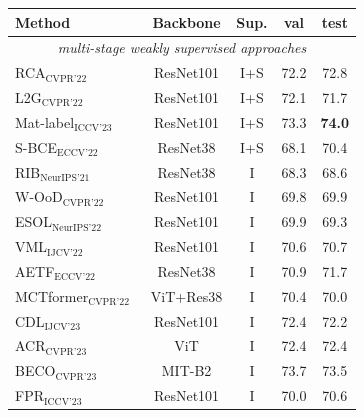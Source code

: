 \begin{table}[!t]
    \centering
    \renewcommand{\arraystretch}{1.2}
    \setlength{\tabcolsep}{6pt}
    \begin{tabular}{l c c c c}
        \hline
        \textbf{Method}                                                               & \textbf{Backbone}   & \textbf{Sup.} & \textbf{val}           & test          \\
        \hline
        \multicolumn{5}{c}{\textit{multi-stage weakly supervised approaches}}                                                    \\
        RCA$_{\text{CVPR'22}}$~\cite{wsss_RCA}             & ResNet101  & I+S  & 72.2          & 72.8          \\
        L2G$_{\text{CVPR'22}}$~\cite{wsss_L2G}             & ResNet101  & I+S  & 72.1          & 71.7          \\
        Mat-label$_{\text{ICCV'23}}$~\cite{wsss_MatLabel}  & ResNet101  & I+S  & 73.3          & \textbf{74.0} \\
        S-BCE$_{\text{ECCV'22}}$~\cite{wsss_s_bce}         & ResNet38   & I+S  & 68.1          & 70.4          \\
        RIB$_{\text{NeurIPS'21}}$~\cite{wsss_rib}          & ResNet38   & I    & 68.3          & 68.6          \\
        W-OoD$_{\text{CVPR'22}}$~\cite{wsss_ood}      & ResNet101  & I    & 69.8          & 69.9          \\
        ESOL$_{\text{NeurIPS'22}}$~\cite{wsss_esol}   & ResNet101  & I    & 69.9          & 69.3          \\
        VML$_{\text{IJCV'22}}$~\cite{wsss_vml}        & ResNet101  & I    & 70.6          & 70.7          \\
        AETF$_{\text{ECCV'22}}$~\cite{wsss_aetf}      & ResNet38   & I    & 70.9          & 71.7          \\
        MCTformer$_{\text{CVPR'22}}$~\cite{wsss_MCTformer} & ViT+Res38  & I    & 70.4          & 70.0          \\
        CDL$_{\text{IJCV'23}}$~\cite{wsss_cdl}        & ResNet101  & I    & 72.4          & 72.2          \\
        ACR$_{\text{CVPR'23}}$~\cite{wsss_acr}        & ViT        & I    & 72.4          & 72.4          \\
        BECO$_{\text{CVPR'23}}$~\cite{wsss_beco}      & MIT-B2     & I    & 73.7          & 73.5          \\
        FPR$_{\text{ICCV'23}}$~\cite{wsss_fpr}        & ResNet101  & I    & 70.0          & 70.6          \\

\end{tabular}
\end{table}
